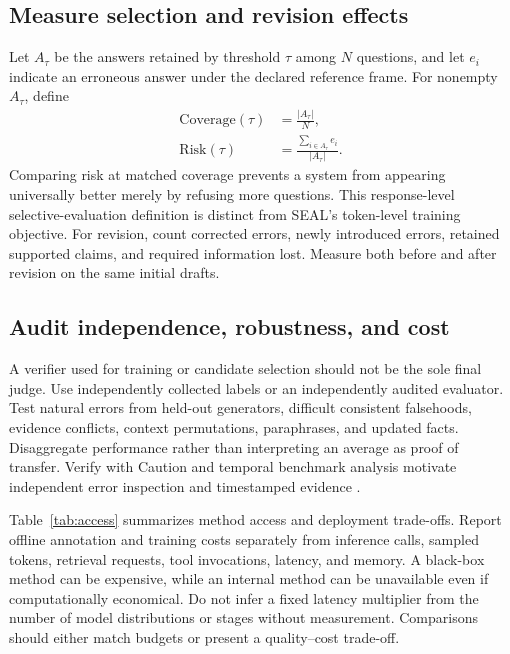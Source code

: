 \subsection{Measure selection and revision effects}
Let $A_\tau$ be the answers retained by threshold $\tau$ among $N$ questions, and let $e_i$ indicate an erroneous answer under the declared reference frame. For nonempty $A_\tau$, define
\begin{equation}
\begin{aligned}
\mathrm{Coverage}(\tau)&=\frac{|A_\tau|}{N},\\
\mathrm{Risk}(\tau)&=\frac{\sum_{i\in A_\tau}e_i}{|A_\tau|}.
\end{aligned}
\end{equation}
Comparing risk at matched coverage prevents a system from appearing universally better merely by refusing more questions. This response-level selective-evaluation definition is distinct from SEAL's token-level training objective. For revision, count corrected errors, newly introduced errors, retained supported claims, and required information lost. Measure both before and after revision on the same initial drafts.

\subsection{Audit independence, robustness, and cost}
A verifier used for training or candidate selection should not be the sole final judge. Use independently collected labels or an independently audited evaluator. Test natural errors from held-out generators, difficult consistent falsehoods, evidence conflicts, context permutations, paraphrases, and updated facts. Disaggregate performance rather than interpreting an average as proof of transfer. Verify with Caution and temporal benchmark analysis motivate independent error inspection and timestamped evidence \citep{godbole-jia-2025-verify,jiang-etal-2026-benchmarks}.

Table~\ref{tab:access} summarizes method access and deployment trade-offs. Report offline annotation and training costs separately from inference calls, sampled tokens, retrieval requests, tool invocations, latency, and memory. A black-box method can be expensive, while an internal method can be unavailable even if computationally economical. Do not infer a fixed latency multiplier from the number of model distributions or stages without measurement. Comparisons should either match budgets or present a quality--cost trade-off.


